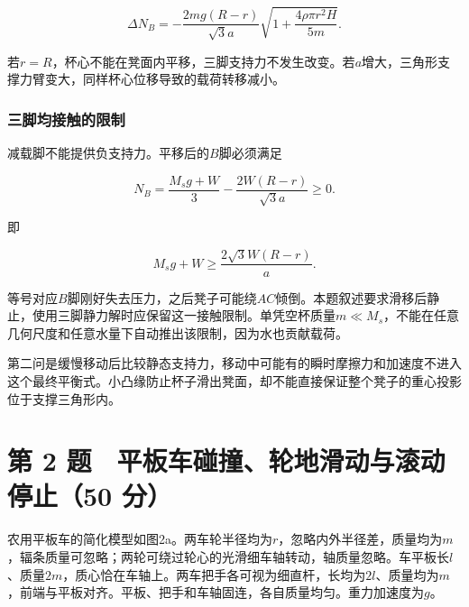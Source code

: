 \documentclass[12pt,a4paper,fontset=fandol]{ctexart}
\begin{document}
\[
\boxed{\Delta N_B=
-\frac{2mg(R-r)}{\sqrt3a}
\sqrt{1+\frac{4\rho\pi r^2H}{5m}}}.
\]

若\(r=R\)，杯心不能在凳面内平移，三脚支持力不发生改变。若\(a\)增大，三角形支撑力臂变大，同样杯心位移导致的载荷转移减小。

\par\noindent\begin{minipage}{\linewidth}
\subsubsection{三脚均接触的限制}\label{ux4e09ux811aux5747ux63a5ux89e6ux7684ux9650ux5236}

减载脚不能提供负支持力。平移后的\(B\)脚必须满足

\[
N_B=\frac{M_sg+W}{3}
-\frac{2W(R-r)}{\sqrt3a}\ge0.
\]

即

\[
\boxed{
M_sg+W\ge \frac{2\sqrt3W(R-r)}a}.
\]

等号对应\(B\)脚刚好失去压力，之后凳子可能绕\(AC\)倾倒。本题叙述要求滑移后静止，使用三脚静力解时应保留这一接触限制。单凭空杯质量\(m\ll M_s\)，不能在任意几何尺度和任意水量下自动推出该限制，因为水也贡献载荷。

第二问是缓慢移动后比较静态支持力，移动中可能有的瞬时摩擦力和加速度不进入这个最终平衡式。小凸缘防止杯子滑出凳面，却不能直接保证整个凳子的重心投影位于支撑三角形内。

\end{minipage}\par
\clearpage

\section{第 2 题　平板车碰撞、轮地滑动与滚动停止（50
分）}\label{ux7b2c-2-ux9898-ux5e73ux677fux8f66ux78b0ux649eux8f6eux5730ux6ed1ux52a8ux4e0eux6edaux52a8ux505cux6b6250-ux5206}

农用平板车的简化模型如图2a。两车轮半径均为\(r\)，忽略内外半径差，质量均为\(m\)，辐条质量可忽略；两轮可绕过轮心的光滑细车轴转动，轴质量忽略。车平板长\(l\)、质量\(2m\)，质心恰在车轴上。两车把手各可视为细直杆，长均为\(2l\)、质量均为\(m\)，前端与平板对齐。平板、把手和车轴固连，各自质量均匀。重力加速度为\(g\)。
\end{document}
